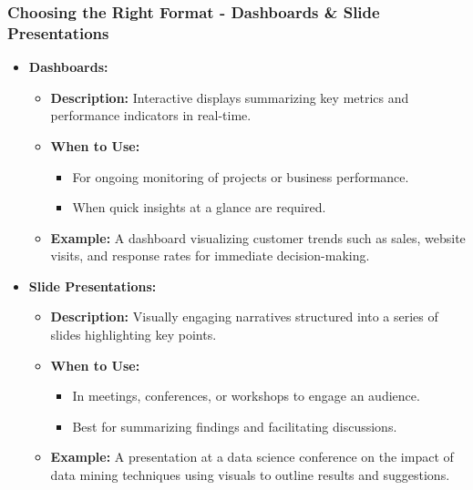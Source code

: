 \documentclass{beamer}
\begin{document}
\begin{frame}[fragile]
    \frametitle{Choosing the Right Format - Dashboards \& Slide Presentations}
    \begin{itemize}
        \item \textbf{Dashboards:}
        \begin{itemize}
            \item \textbf{Description:} Interactive displays summarizing key metrics and performance indicators in real-time.
            \item \textbf{When to Use:}
            \begin{itemize}
                \item For ongoing monitoring of projects or business performance.
                \item When quick insights at a glance are required.
            \end{itemize}
            \item \textbf{Example:} A dashboard visualizing customer trends such as sales, website visits, and response rates for immediate decision-making.
        \end{itemize}
        
        \item \textbf{Slide Presentations:}
        \begin{itemize}
            \item \textbf{Description:} Visually engaging narratives structured into a series of slides highlighting key points.
            \item \textbf{When to Use:}
            \begin{itemize}
                \item In meetings, conferences, or workshops to engage an audience.
                \item Best for summarizing findings and facilitating discussions.
            \end{itemize}
            \item \textbf{Example:} A presentation at a data science conference on the impact of data mining techniques using visuals to outline results and suggestions.
        \end{itemize}
    \end{itemize}
\end{frame}
\end{document}
